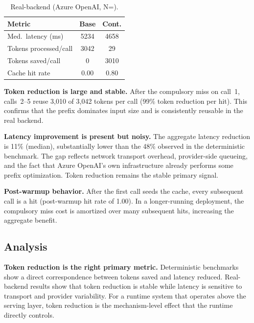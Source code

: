 \documentclass[10pt,twocolumn]{article}
\begin{document}
\begin{table}[t]
\centering
{\small
\caption{Real-backend (Azure OpenAI, N\!=).}
\label{tab:real-backend-prelim}
\begin{tabular}{@{}lcc@{}}
\toprule
\textbf{Metric} & \textbf{Base} & \textbf{Cont.} \\
\midrule
Med.\ latency (ms)    & 5234  & 4658 \\
Tokens processed/call  & 3042  & 29    \\
Tokens saved/call      &   0   & 3010  \\
Cache hit rate         & 0.00  & 0.80  \\
\bottomrule
\end{tabular}
}
\end{table}

\textbf{Token reduction is large and stable.} After the compulsory miss on call~1, calls~2--5 reuse 3,010 of 3,042 tokens per call (99\% token reduction per hit). This confirms that the prefix dominates input size and is consistently reusable in the real backend.

\textbf{Latency improvement is present but noisy.} The aggregate latency reduction is 11\% (median), substantially lower than the 48\% observed in the deterministic benchmark. The gap reflects network transport overhead, provider-side queueing, and the fact that Azure OpenAI's own infrastructure already performs some prefix optimization. Token reduction remains the stable primary signal.

\textbf{Post-warmup behavior.} After the first call seeds the cache, every subsequent call is a hit (post-warmup hit rate of 1.00). In a longer-running deployment, the compulsory miss cost is amortized over many subsequent hits, increasing the aggregate benefit.

\subsection{Analysis}

\textbf{Token reduction is the right primary metric.} Deterministic benchmarks show a direct correspondence between tokens saved and latency reduced. Real-backend results show that token reduction is stable while latency is sensitive to transport and provider variability. For a runtime system that operates above the serving layer, token reduction is the mechanism-level effect that the runtime directly controls.
\end{document}
